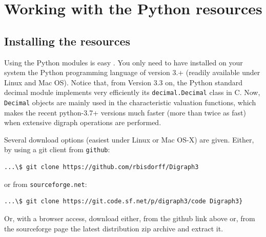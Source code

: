 %
%
%
\chapter{Working with the \Digraph Python resources}
\label{sec:1} %



\section{Installing the \Digraph resources}
\label{sec:1.1}

Using the \Digraph Python modules is easy \citep{BIS-2021}. You only need to have installed on your system the Python programming language of version 3.+ (readily available under Linux and Mac OS). Notice that, from Version 3.3 on, the Python standard decimal module implements very efficiently its \texttt{decimal.Decimal} class in C. Now, \texttt{Decimal} objects are mainly used in the \Digraph characteristic valuation functions, which makes the recent python-3.7+ versions much faster (more than twice as fast) when extensive digraph operations are performed.

Several download options (easiest under Linux or Mac OS-X) are given. Either, by using a git client from \texttt{github}:
\begin{footnotesize}
\begin{verbatim}
...\$ git clone https://github.com/rbisdorff/Digraph3
\end{verbatim}
\end{footnotesize}
or from \texttt{sourceforge.net}:
\begin{footnotesize}
\begin{verbatim}
...\$ git clone https://git.code.sf.net/p/digraph3/code Digraph3}
\end{verbatim}
\end{footnotesize}
Or, with a browser access, download either, from the github link above or, from the sourceforge page the latest distribution zip archive and extract it.

